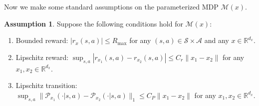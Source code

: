 \documentclass{article}
\theoremstyle{plain}
\theoremstyle{definition}
\newtheorem{assumption}{Assumption}
\theoremstyle{remark}
\def\R{\mathbb R}
\def\cA{\mathcal A}
\def\cM{\mathcal M}
\def\cP{\mathcal P}
\def\cS{\mathcal S}
\begin{document}
Now we make some standard assumptions on the parameterized MDP $\cM(x)$.
\begin{assumption}
    \label{assumption: appendix-single-policy-properties}
    Suppose the following conditions hold for $\cM(x)$:
    \begin{enumerate}
        \vspace{-2mm}
        \item Bounded reward: $|r_x(s,a)| \leq R_{\max}$ for any $(s,a) \in \cS \times \cA$ and any $x \in \R^{d_x}$.
        \item Lipschitz reward: $\sup_{s,a} |r_{x_1}(s,a) - r_{x_2}(s,a)| \leq C_r \|x_1 - x_2\|$ for any $x_1,x_2 \in \R^{d_x}$.
        \item Lipschitz transition: $\sup_{s,a} \|\cP_{x_1}(\cdot|s,a) - \cP_{x_2}(\cdot|s,a)\|_1 \leq C_P \|x_1 - x_2\|$ for any $x_1,x_2 \in \R^{d_x}$.
    \end{enumerate}
\end{assumption}
\end{document}

